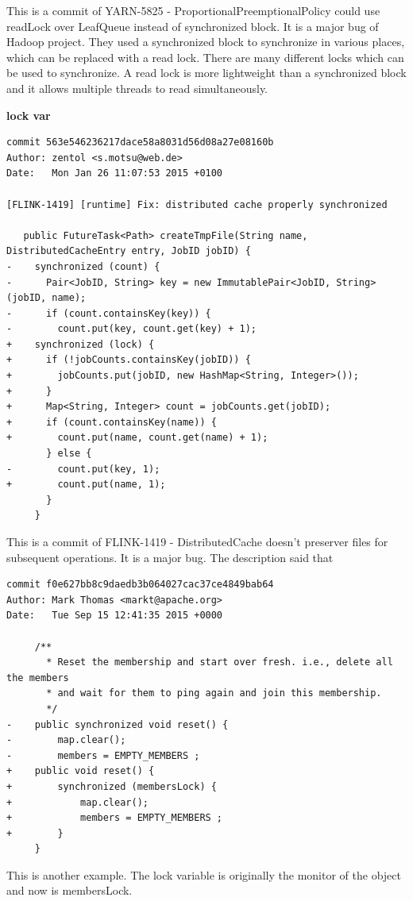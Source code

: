 \documentclass[conference]{IEEEtran}
\begin{document}
This is a commit of YARN-5825 - ProportionalPreemptionalPolicy could use readLock over LeafQueue instead of synchronized block. It is a major bug of Hadoop project. They used a synchronized block to synchronize in various places, which can be replaced with a read lock. There are many different locks which can be used to synchronize. A read lock is more lightweight than a synchronized block and it allows multiple threads to read simultaneously.

\textbf{lock var}
\begin{lstlisting}
commit 563e546236217dace58a8031d56d08a27e08160b
Author: zentol <s.motsu@web.de>
Date:   Mon Jan 26 11:07:53 2015 +0100

[FLINK-1419] [runtime] Fix: distributed cache properly synchronized

   public FutureTask<Path> createTmpFile(String name, DistributedCacheEntry entry, JobID jobID) {
-    synchronized (count) {
-      Pair<JobID, String> key = new ImmutablePair<JobID, String>(jobID, name);
-      if (count.containsKey(key)) {
-        count.put(key, count.get(key) + 1);
+    synchronized (lock) {
+      if (!jobCounts.containsKey(jobID)) {
+        jobCounts.put(jobID, new HashMap<String, Integer>());
+      }
+      Map<String, Integer> count = jobCounts.get(jobID);
+      if (count.containsKey(name)) {
+        count.put(name, count.get(name) + 1);
       } else {
-        count.put(key, 1);
+        count.put(name, 1);
       }
     }
\end{lstlisting}

This is a commit of FLINK-1419 - DistributedCache doesn't preserver files for subsequent operations. It is a major bug. The description said that 

\begin{lstlisting}
commit f0e627bb8c9daedb3b064027cac37ce4849bab64
Author: Mark Thomas <markt@apache.org>
Date:   Tue Sep 15 12:41:35 2015 +0000

     /**
       * Reset the membership and start over fresh. i.e., delete all the members
       * and wait for them to ping again and join this membership.
       */
-    public synchronized void reset() {
-        map.clear();
-        members = EMPTY_MEMBERS ;
+    public void reset() {
+        synchronized (membersLock) {
+            map.clear();
+            members = EMPTY_MEMBERS ;
+        }
     }
\end{lstlisting}

This is another example. The lock variable is originally the monitor of the object and now is membersLock.
\end{document}
